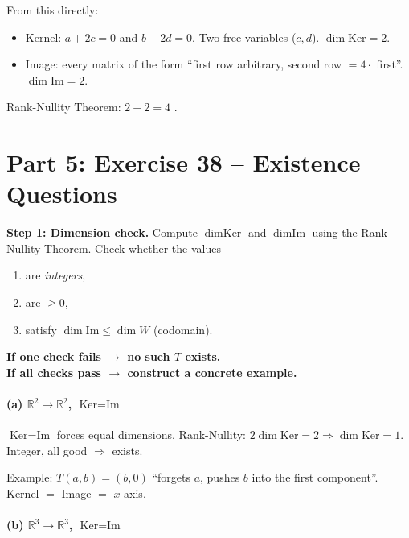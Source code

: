 \documentclass[a4paper,12pt]{article}
\begin{document}
From this directly:
\begin{itemize}[nosep]
    \item Kernel: $a + 2c = 0$ and $b + 2d = 0$. Two free variables ($c, d$). $\dim \text{Ker} = 2$.
    \item Image: every matrix of the form ``first row arbitrary, second row $= 4 \cdot$ first''. $\dim \text{Im} = 2$.
\end{itemize}

Rank-Nullity Theorem: $2 + 2 = 4$ \checkmark.

\newpage

\part*{Part 5: Exercise 38 -- Existence Questions}

\begin{merkbox}[title={Main tool for existence problems}]
\textbf{Step 1: Dimension check.} Compute $\dim \text{Ker}$ and $\dim \text{Im}$ using the Rank-Nullity Theorem. Check whether the values
\begin{enumerate}[nosep]
    \item are \emph{integers},
    \item are $\geq 0$,
    \item satisfy $\dim \text{Im} \leq \dim W$ (codomain).
\end{enumerate}
\textbf{If one check fails $\to$ no such $T$ exists.} \\
\textbf{If all checks pass $\to$ construct a concrete example.}
\end{merkbox}

\subsection*{(a) $\mathbb{R}^2 \to \mathbb{R}^2$, $\text{Ker} = \text{Im}$}

$\text{Ker} = \text{Im}$ forces equal dimensions. Rank-Nullity: $2 \dim \text{Ker} = 2 \Rightarrow \dim \text{Ker} = 1$. Integer, all good $\Rightarrow$ exists.

Example: $T(a, b) = (b, 0)$ ``forgets $a$, pushes $b$ into the first component''. Kernel $=$ Image $=$ $x$-axis.

\subsection*{(b) $\mathbb{R}^3 \to \mathbb{R}^3$, $\text{Ker} = \text{Im}$}
\end{document}

